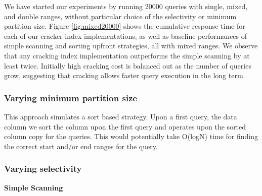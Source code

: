 We have started our experiments by running 20000 queries with single, mixed, and double ranges, without particular choice of the selectivity or minimum partition size. Figure \ref{fig:mixed20000} shows the cumulative response time for each of our cracker index implementations, as well as baseline performances of simple scanning and sorting upfront strategies, all with mixed ranges. We observe that any cracking index implementation outperforms the simple scanning by at least twice. Initially high cracking cost is balanced out as the number of queries grow, suggesting that cracking allows faster query execution in the long term.
\subsubsection{Varying minimum partition size}


This approach simulates a sort based strategy. Upon a first query, the data column we sort the column upon the first query and operates upon the sorted column copy for the queries. This would potentially take O(logN) time for finding the correct start and/or end ranges for the query.

\subsubsection{Varying selectivity}

\textbf{Simple Scanning}
\label{sec:experiments}


